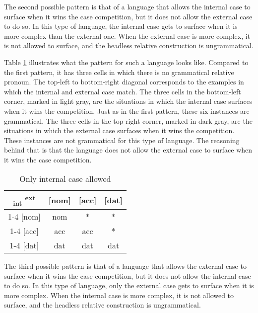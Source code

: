 The second possible pattern is that of a language that allows the internal case to surface when it wins the case competition, but it does not allow the external case to do so. In this type of language, the internal case gets to surface when it is more complex than the external one. When the external case is more complex, it is not allowed to surface, and the headless relative construction is ungrammatical.

Table \ref{tbl:case-competition-only-int} illustrates what the pattern for such a language looks like. Compared to the first pattern, it has three cells in which there is no grammatical relative pronoun.
The top-left to bottom-right diagonal corresponds to the examples in which the internal and external case match.
The three cells in the bottom-left corner, marked in light gray, are the situations in which the internal case surfaces when it wins the competition.
Just as in the first pattern, these six instances are grammatical.
The three cells in the top-right corner, marked in dark gray, are the situations in which the external case surfaces when it wins the competition. These instances are not grammatical for this type of language. The reasoning behind that is that the language does not allow the external case to surface when it wins the case competition.

\begin{table}[H]
  \center
  \caption{Only internal case allowed}
  \begin{tabular}{c|c|c|c}
    \toprule
    \textsubscript{\ac{int}} \textsuperscript{\ac{ext}}
           & [\ac{nom}]
           & [\ac{acc}]
           & [\ac{dat}]
           \\ \cmidrule{1-4}
       [\ac{nom}]
           & \ac{nom}
           & \cellcolor{DG}*
           & \cellcolor{DG}*
           \\ \cmidrule{1-4}
       [\ac{acc}]
           & \cellcolor{LG}\ac{acc}
           & \ac{acc}
           & \cellcolor{DG}*
           \\ \cmidrule{1-4}
       [\ac{dat}]
           & \cellcolor{LG}\ac{dat}
           & \cellcolor{LG}\ac{dat}
           & \ac{dat}
           \\
     \bottomrule
  \end{tabular}
    \label{tbl:case-competition-only-int}
\end{table}

The third possible pattern is that of a language that allows the external case to surface when it wins the case competition, but it does not allow the internal case to do so. In this type of language, only the external case gets to surface when it is more complex. When the internal case is more complex, it is not allowed to surface, and the headless relative construction is ungrammatical.

